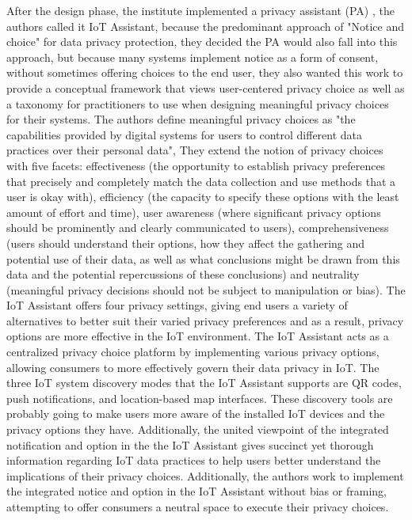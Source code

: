 \documentclass[conference]{IEEEtran}
\begin{document}
After the design phase, the institute implemented a privacy assistant (PA) \cite{FengDesign},
the authors called it IoT Assistant, because the predominant approach of
"Notice and choice" for data privacy protection, they decided the PA would
also fall into this approach, but because many systems implement notice as
a form of consent, without sometimes offering choices to the end user, they
also wanted this work to provide a conceptual framework that views user-centered
privacy choice as well as a taxonomy for practitioners to use when designing meaningful
privacy choices for their systems. The authors define
meaningful privacy choices as "the capabilities provided by digital
systems for users to control different data practices over their personal data", They
extend the notion of privacy choices with five facets: effectiveness (the opportunity to
establish privacy preferences that precisely and completely match the data
collection and use methods that a user is okay with), efficiency
(the capacity to specify these options with the least amount of effort and time),
user awareness (where significant privacy options should be prominently and clearly
communicated to users), comprehensiveness (users should understand their options,
how they affect the gathering and potential use of their data, as well as what
conclusions might be drawn from this data and the potential repercussions of
these conclusions) and neutrality (meaningful privacy decisions should not be
subject to manipulation or bias). The IoT Assistant offers four privacy settings, giving end users
a variety of alternatives to better suit their varied privacy preferences and as a result,
privacy options are more effective in the IoT environment. The IoT Assistant acts as a
centralized privacy choice platform by implementing various privacy options, allowing
consumers to more effectively govern their data privacy in IoT. The three IoT system
discovery modes that the IoT Assistant supports are QR codes, push notifications,
and location-based map interfaces. These discovery tools are probably going to make
users more aware of the installed IoT devices and the privacy options they have.
Additionally, the united viewpoint of the integrated notification and option in the
the IoT Assistant gives succinct yet thorough information regarding IoT data practices to help users
better understand the implications of their privacy choices. Additionally, the authors
work to implement the integrated notice and option in the IoT Assistant without bias or framing,
attempting to offer consumers a neutral space to execute their privacy choices.
\end{document}
